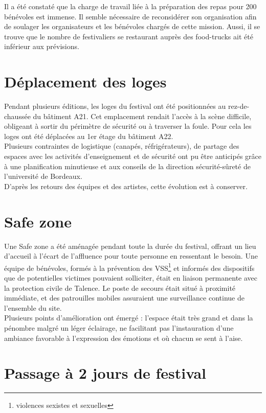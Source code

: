 \documentclass[12pt,a4paper]{report}
\begin{document}
Il a été constaté que la charge de travail liée à la préparation des repas pour 200 bénévoles est immense. Il semble nécessaire de reconsidérer son organisation afin de soulager les organisateurs et les bénévoles chargés de cette mission. Aussi, il se trouve que le nombre de festivaliers se restaurant auprès des food-trucks ait été inférieur aux prévisions.

\section{Déplacement des loges}
Pendant plusieurs éditions, les loges du festival ont été positionnées au rez-de-chaussée du bâtiment A21. Cet emplacement rendait l'accès à la scène difficile, obligeant à sortir du périmètre de sécurité ou à traverser la foule. Pour cela les loges ont été déplacées au 1er étage du bâtiment A22.\\

Plusieurs contraintes de logistique (canapés, réfrigérateurs), de partage des espaces avec les activités d'enseignement et de sécurité ont pu être anticipés grâce à une planification minutieuse et aux conseils de la direction sécurité-sûreté de l'université de Bordeaux.\\

D’après les retours des équipes et des artistes, cette évolution est à conserver.

\section{Safe zone}
Une \og Safe zone \fg{} a été aménagée pendant toute la durée du festival, offrant un lieu d'accueil à l'écart de l'affluence pour toute personne en ressentant le besoin. Une équipe de bénévoles, formés à la prévention des VSS\footnote{violences sexistes et sexuelles} et informés des dispositifs que de potentielles victimes pouvaient solliciter, était en liaison permanente avec la protection civile de Talence. Le poste de secours était situé à proximité immédiate, et des patrouilles mobiles assuraient une surveillance continue de l'ensemble du site.\\

Plusieurs points d’amélioration ont émergé : l’espace était très grand et dans la pénombre malgré un léger éclairage, ne facilitant pas l’instauration d’une ambiance favorable à l’expression des émotions et où chacun se sent à l’aise.

\section{Passage à 2 jours de festival}
\end{document}
